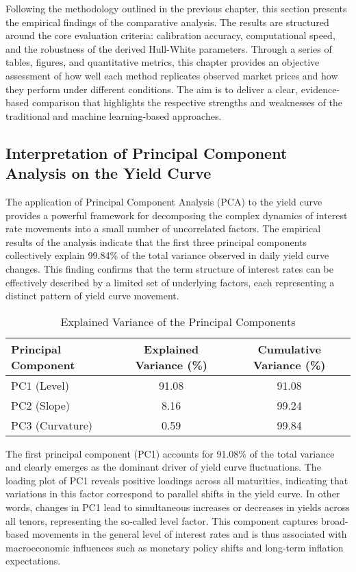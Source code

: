 Following the methodology outlined in the previous chapter, this section presents the empirical findings of the comparative analysis. The results are structured around the core evaluation criteria: calibration accuracy, computational speed, and the robustness of the derived Hull-White parameters. Through a series of tables, figures, and quantitative metrics, this chapter provides an objective assessment of how well each method replicates observed market prices and how they perform under different conditions. The aim is to deliver a clear, evidence-based comparison that highlights the respective strengths and weaknesses of the traditional and machine learning-based approaches.

\subsection{Interpretation of Principal Component Analysis on the Yield Curve}
The application of Principal Component Analysis (PCA) to the yield curve provides a powerful framework for decomposing the complex dynamics of interest rate movements into a small number of uncorrelated factors. The empirical results of the analysis indicate that the first three principal components collectively explain 99.84\% of the total variance observed in daily yield curve changes. This finding confirms that the term structure of interest rates can be effectively described by a limited set of underlying factors, each representing a distinct pattern of yield curve movement.

\begin{table}[H]
	\centering
	\label{tab:pca_variance}
	\begin{tabular}{lcc}
		\toprule
		Principal Component & Explained Variance (\%) & Cumulative Variance (\%) \\
		\midrule
		PC1 (Level)                  & 91.08                            & 91.08                             \\
		PC2 (Slope)                  & 8.16                             & 99.24                             \\
		PC3 (Curvature)              & 0.59                             & 99.84                             \\
		\bottomrule
	\end{tabular}
	\caption{Explained Variance of the Principal Components}
\end{table}

The first principal component (PC1) accounts for 91.08\% of the total variance and clearly emerges as the dominant driver of yield curve fluctuations. The loading plot of PC1 reveals positive loadings across all maturities, indicating that variations in this factor correspond to parallel shifts in the yield curve. In other words, changes in PC1 lead to simultaneous increases or decreases in yields across all tenors, representing the so-called level factor. This component captures broad-based movements in the general level of interest rates and is thus associated with macroeconomic influences such as monetary policy shifts and long-term inflation expectations.

